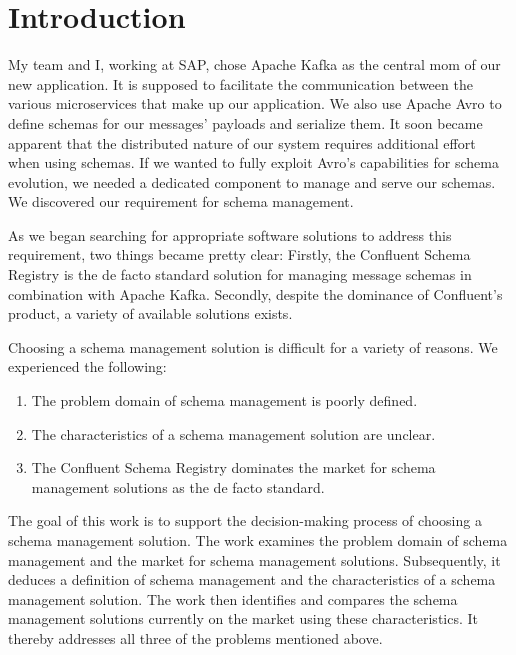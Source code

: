 
\section{Introduction}\label{sec:introduction}

My team and I, working at SAP, chose Apache Kafka as the central \gls{mom} of our new application.
It is supposed to facilitate the communication between the various microservices that make up our application.
We also use Apache Avro to define schemas for our messages' payloads and serialize them.
It soon became apparent that the distributed nature of our system requires additional effort when using schemas.
If we wanted to fully exploit Avro's capabilities for schema evolution, we needed a dedicated component to manage and serve our schemas.
We discovered our requirement for schema management.

As we began searching for appropriate software solutions to address this requirement, two things became pretty clear: Firstly, the Confluent Schema Registry is the de facto standard solution for managing message schemas in combination with Apache Kafka. Secondly, despite the dominance of Confluent's product, a variety of available solutions exists.

Choosing a schema management solution is difficult for a variety of reasons. We experienced the following:

\begin{enumerate}
  \item The problem domain of schema management is poorly defined.
  \item The characteristics of a schema management solution are unclear.
  \item The Confluent Schema Registry dominates the market for schema management solutions as the de facto standard.
\end{enumerate}

The goal of this work is to support the decision-making process of choosing a schema management solution.
The work examines the problem domain of schema management and the market for schema management solutions.
Subsequently, it deduces a definition of schema management and the characteristics of a schema management solution.
The work then identifies and compares the schema management solutions currently on the market using these characteristics.
It thereby addresses all three of the problems mentioned above.

